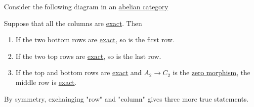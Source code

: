 \documentclass[../../../main]{subfiles}
\begin{document}
\begin{theorem}\label{thm:nine-lemma}
  Consider the following diagram in an \hyperref[def:abelian-category]{abelian category}
  \begin{center}
  \end{center}
  Suppose that all the columns are \hyperref[def:short-exact-sequence]{exact}. Then
  \begin{enumerate}
    \item If the two bottom rows are \hyperref[def:short-exact-sequence]{exact}, so is the first row.
    \item If the two top rows are \hyperref[def:short-exact-sequence]{exact}, so is the last row.
    \item If the top and bottom rows are \hyperref[def:short-exact-sequence]{exact} and \(A_{2} \to C_{2}\) is the \hyperref[def:zero-object]{zero morphism}, the middle row is \hyperref[def:short-exact-sequence]{exact}.
  \end{enumerate}

  By symmetry, exchainging "row" and "column" gives three more true statements.
\end{theorem}
\end{document}
